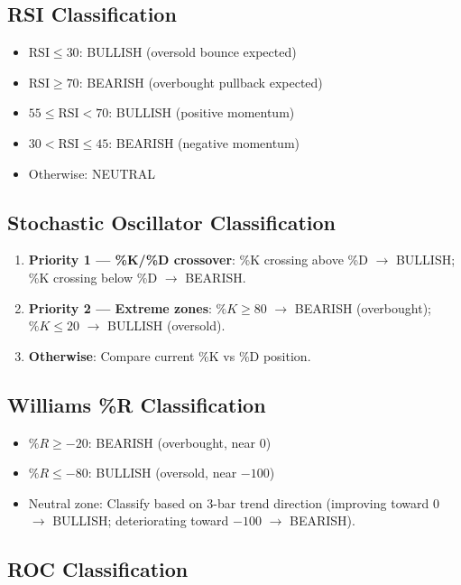 \subsection{RSI Classification}

\begin{itemize}
\item $\mathrm{RSI} \leq 30$: BULLISH (oversold bounce expected)
\item $\mathrm{RSI} \geq 70$: BEARISH (overbought pullback expected)
\item $55 \leq \mathrm{RSI} < 70$: BULLISH (positive momentum)
\item $30 < \mathrm{RSI} \leq 45$: BEARISH (negative momentum)
\item Otherwise: NEUTRAL
\end{itemize}

\subsection{Stochastic Oscillator Classification}

\begin{enumerate}
\item \textbf{Priority 1 --- \%K/\%D crossover}: \%K crossing above \%D $\rightarrow$ BULLISH; \%K crossing below \%D $\rightarrow$ BEARISH.
\item \textbf{Priority 2 --- Extreme zones}: $\%K \geq 80$ $\rightarrow$ BEARISH (overbought); $\%K \leq 20$ $\rightarrow$ BULLISH (oversold).
\item \textbf{Otherwise}: Compare current \%K vs \%D position.
\end{enumerate}

\subsection{Williams \%R Classification}

\begin{itemize}
\item $\%R \geq -20$: BEARISH (overbought, near 0)
\item $\%R \leq -80$: BULLISH (oversold, near $-100$)
\item Neutral zone: Classify based on 3-bar trend direction (improving toward 0 $\rightarrow$ BULLISH; deteriorating toward $-100$ $\rightarrow$ BEARISH).
\end{itemize}

\subsection{ROC Classification}

